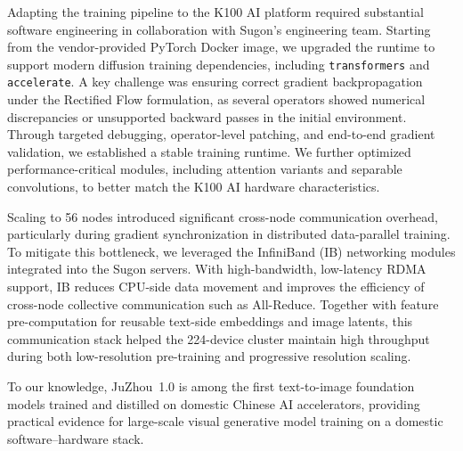 
Adapting the training pipeline to the K100 AI platform required substantial software engineering in collaboration with Sugon's engineering team. Starting from the vendor-provided PyTorch Docker image, we upgraded the runtime to support modern diffusion training dependencies, including \texttt{transformers} and \texttt{accelerate}. A key challenge was ensuring correct gradient backpropagation under the Rectified Flow formulation, as several operators showed numerical discrepancies or unsupported backward passes in the initial environment. Through targeted debugging, operator-level patching, and end-to-end gradient validation, we established a stable training runtime. We further optimized performance-critical modules, including attention variants and separable convolutions, to better match the K100 AI hardware characteristics.

Scaling to 56 nodes introduced significant cross-node communication overhead, particularly during gradient synchronization in distributed data-parallel training. To mitigate this bottleneck, we leveraged the InfiniBand (IB) networking modules integrated into the Sugon servers. With high-bandwidth, low-latency RDMA support, IB reduces CPU-side data movement and improves the efficiency of cross-node collective communication such as All-Reduce. Together with feature pre-computation for reusable text-side embeddings and image latents, this communication stack helped the 224-device cluster maintain high throughput during both low-resolution pre-training and progressive resolution scaling.

To our knowledge, JuZhou~1.0 is among the first text-to-image foundation models trained and distilled on domestic Chinese AI accelerators, providing practical evidence for large-scale visual generative model training on a domestic software--hardware stack.
